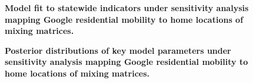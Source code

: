\begin{figure}[ht]
    \caption{\textbf{Model fit to statewide indicators under sensitivity analysis mapping Google residential mobility to home locations of mixing matrices.}}
    \label{fig:residential_sensitivity_outputs}
\end{figure}

\begin{figure}[ht]
    \caption{\textbf{Posterior distributions of key model parameters under sensitivity analysis mapping Google residential mobility to home locations of mixing matrices.}}
    \label{fig:residential_sensitivity_key_params}
\end{figure}

